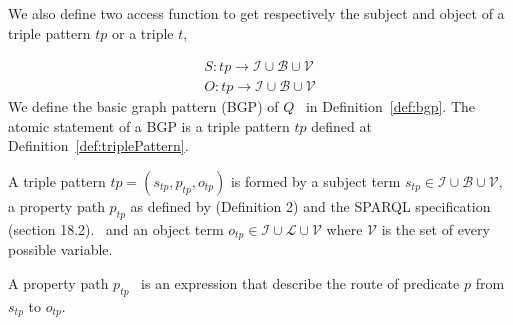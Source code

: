 We also define two access function to get respectively the subject and object of a triple pattern $tp$ or a triple $t$,

\begin{equation}
    \begin{aligned}
        S: tp \rightarrow \mathcal{I} \cup \mathcal{B} \cup \mathcal{V} \\
        O: tp \rightarrow \mathcal{I} \cup \mathcal{B} \cup \mathcal{V}
    \end{aligned}
 \end{equation}
\iffalse
We define the basic graph pattern (BGP) of $Q$~ in Definition~\ref{def:bgp}.
The atomic statement of a BGP is a triple pattern $tp$ defined at Definition~\ref{def:triplePattern}.

\begin{definition}\label{def:triplePattern}
    A triple pattern $tp = (s_{tp},p_{tp},o_{tp})$ is formed by a subject term $s_{tp} \in \mathcal{I} \cup \mathcal{B} \cup \mathcal{V}$, 
    a property path  $p_{tp}$ as defined by  \citeauthor{Kostylev2015} (Definition 2) and the SPARQL specification (section 18.2).~ 
    and an object term  $o_{tp} \in \mathcal{I} \cup \mathcal{L} \cup \mathcal{V}$ 
    where $\mathcal{V}$ is the set of every possible variable. 
\end{definition}

\begin{definition}\label{def:propertyPath}
   A property path $p_{tp}$~\cite{Kostylev2015} is an expression that describe the route of predicate $p$ from $s_{tp}$ to $o_{tp}$.
   \iffalse
   A property path in $tp$ is defined as follow:
   \begin{equation}
    p_{tp} ::= p \in \mathcal{I} | (p_{tpi}/p_{tpj}) | (p_{tpi}|p_{tpj}) | p_{tpi}* | p_{tpi}+ | p_{tpi}? | !p_{tpi}| p_{tpi}^{-}
   \end{equation}.
   The "$/$" operator chain two property path, the alternative operator "$|$" define a possibility between $p_{tpi}$ and $p_{tpj}$.
   The "$^-$" operator inverse the path from $s_{tp}$ to $o_{tp}$.
   The "$!$" represent the negation of a path $p_{tpi}$ such as $p_{tpi} = \mathcal{I} \setminus p_{tpi}$.
   The "$*$", "$+$" and "$?$", refered to in this paper as \emph{cardinality property paths}, are respectively; the repetition of 0 and more of $p_{tpi}$, 
   the repetition of 1 and more of $p_{tpi}$ and the presence or absence of $p_{tpi}$.
   \fi
\end{definition}

